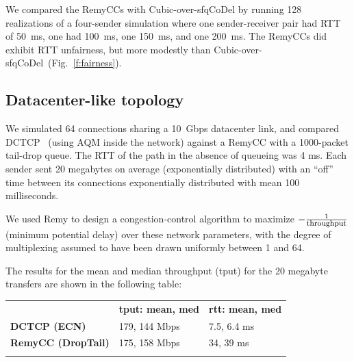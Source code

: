 We compared the RemyCCs with Cubic-over-sfqCoDel by running 128
realizations of a four-sender simulation where one sender-receiver
pair had RTT of 50~ms, one had 100~ms, one 150~ms, and one 200~ms. The
RemyCCs did exhibit RTT unfairness, but more modestly than
Cubic-over-sfqCoDel~(Fig.~\ref{f:fairness}).

\subsection{Datacenter-like topology}

We simulated 64 connections sharing a 10~Gbps datacenter link, and
compared DCTCP~\cite{dctcp} (using AQM inside the network) against
a RemyCC with a 1000-packet tail-drop queue. The RTT of
the path in the absence of queueing was 4 ms. Each sender sent 20
megabytes on average (exponentially distributed) with an ``off'' time
between its connections exponentially distributed with mean 100
milliseconds.

We used Remy to design a congestion-control algorithm to maximize
$-\frac{1}{\mbox{\footnotesize throughput}}$ (minimum potential delay) over these network
parameters, with the degree of multiplexing assumed to have been drawn
uniformly between 1 and 64.




The results for the mean and median throughput (tput) for the 20 megabyte
transfers are shown in the following table:

\begin{tabular}{lll}
& \bf tput: mean, med & \bf rtt: mean, med\\
\bf DCTCP (ECN) & 179, 144 Mbps & 7.5, 6.4 ms\\
\bf RemyCC (DropTail) & 175, 158 Mbps & 34, 39 ms \\
\vspace{\baselineskip}
\end{tabular}

